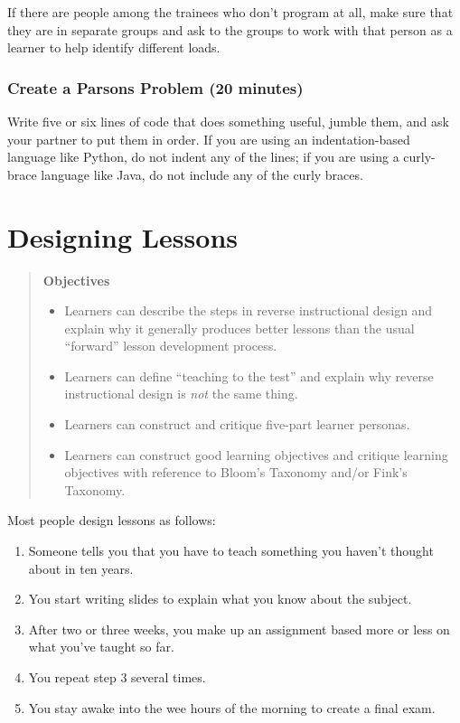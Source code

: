 \documentclass[10pt,statementpaper]{memoir}
\providecommand{\tightlist}{%
  \setlength{\itemsep}{0pt}\setlength{\parskip}{0pt}}
\begin{document}
If there are people among the trainees who don't program at all, make
sure that they are in separate groups and ask to the groups to work with
that person as a learner to help identify different loads.

\subsection*{Create a Parsons Problem (20
minutes)}\label{create-a-parsons-problem-20-minutes}

Write five or six lines of code that does something useful, jumble them,
and ask your partner to put them in order. If you are using an
indentation-based language like Python, do not indent any of the lines;
if you are using a curly-brace language like Java, do not include any of
the curly braces.

\chapter{Designing Lessons}\label{designing-lessons}

\begin{quote}
\textbf{Objectives}

\begin{itemize}
\tightlist
\item
  Learners can describe the steps in reverse instructional design and
  explain why it generally produces better lessons than the usual
  ``forward'' lesson development process.
\item
  Learners can define ``teaching to the test'' and explain why reverse
  instructional design is \emph{not} the same thing.
\item
  Learners can construct and critique five-part learner personas.
\item
  Learners can construct good learning objectives and critique learning
  objectives with reference to Bloom's Taxonomy and/or Fink's Taxonomy.
\end{itemize}
\end{quote}

Most people design lessons as follows:

\begin{enumerate}
\def\labelenumi{\arabic{enumi}.}
\item
  Someone tells you that you have to teach something you haven't thought
  about in ten years.
\item
  You start writing slides to explain what you know about the subject.
\item
  After two or three weeks, you make up an assignment based more or less
  on what you've taught so far.
\item
  You repeat step 3 several times.
\item
  You stay awake into the wee hours of the morning to create a final
  exam.
\end{enumerate}
\end{document}
